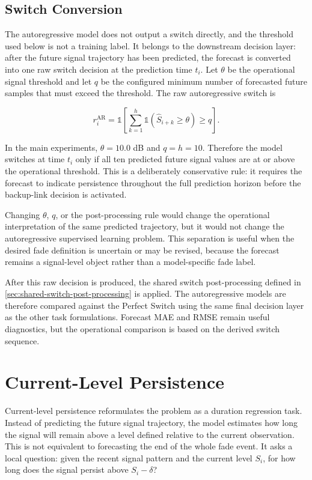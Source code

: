 \subsection{Switch Conversion}

The autoregressive model does not output a switch directly, and the threshold
used below is not a training label. It belongs to the downstream decision layer:
after the future signal trajectory has been predicted, the forecast is converted
into one raw switch decision at the prediction time \(t_i\). Let \(\theta\) be
the operational signal threshold and let \(q\) be the configured minimum number
of forecasted future samples that must exceed the threshold. The raw
autoregressive switch is

\[
  r_i^{\text{AR}}
  =
  \mathbb{1}
  \left[
    \sum_{k=1}^{h}
    \mathbb{1}\left(\widehat{S}_{i+k} \ge \theta\right)
    \ge q
  \right].
\]

In the main experiments, \(\theta=10.0\) dB and \(q=h=10\). Therefore the model
switches at time \(t_i\) only if all ten predicted future signal values are at
or above the operational threshold. This is a deliberately conservative rule:
it requires the forecast to indicate persistence throughout the full prediction
horizon before the backup-link decision is activated.

Changing \(\theta\), \(q\), or the post-processing rule would change the
operational interpretation of the same predicted trajectory, but it would not
change the autoregressive supervised learning problem. This separation is useful
when the desired fade definition is uncertain or may be revised, because the
forecast remains a signal-level object rather than a model-specific fade label.

After this raw decision is produced, the shared switch post-processing defined
in \cref{sec:shared-switch-post-processing} is applied. The autoregressive
models are therefore compared against the Perfect Switch using the same final
decision layer as the other task formulations. Forecast MAE and RMSE remain
useful diagnostics, but the operational comparison is based on the derived
switch sequence.

\section{Current-Level Persistence}
\label{sec:current-level-formulation}

Current-level persistence reformulates the problem as a duration regression
task. Instead of predicting the future signal trajectory, the model estimates
how long the signal will remain above a level defined relative to the current
observation. This is not equivalent to forecasting the end of the whole fade
event. It asks a local question: given the recent signal pattern and the current
level \(S_i\), for how long does the signal persist above \(S_i-\delta\)?

